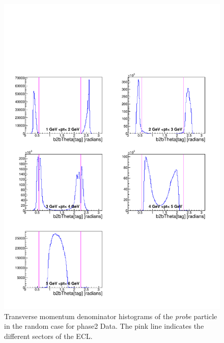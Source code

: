 \documentclass[a4paper,11pt,twosided,final,german,openbib,pdftex,listof=totoc,bibliography=totoc]{scrbook}
\begin{document}
\begin{appendix}
\begin{figure}[!htbp]
	\centering
	\includegraphics[width=\textwidth]{Plots/master/xPtMThetaRandomD_Data}
	\caption[Transverse Momentum $\phi$ Random Denominator Histogram Phase2 Data]{Transverse momentum denominator histograms of the \textit{probe} particle in the random case for phase2 Data. The pink line indicates the different sectors of the ECL.}
	\label{plt:PtMThetaRandomD_Data}
\end{figure}





\end{appendix}
\end{document}

